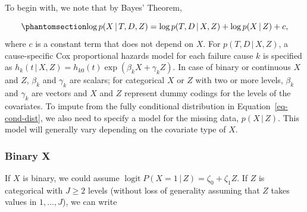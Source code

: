 \documentclass[
  letterpaper,
  DIV=11,
  numbers=noendperiod]{scrreprt}
\DeclareMathOperator{\logit}{logit}
\newcommand{\given}{\,|\,}
\begin{document}
To begin with, we note that by Bayes' Theorem,

\begin{equation}\phantomsection\label{eq-cond-dist}{
    \log p(X \given T,D,Z) = \log p(T,D \given X, Z) + \log p(X \given Z) + c,
}\end{equation} where \(c\) is a constant term that does not depend on
\(X\). For \(p(T,D \given X, Z)\), a cause-specific Cox proportional
hazards model for each failure cause \(k\) is specified as
\(h_k(t \given X, Z) = h_{k0}(t)\exp(\beta_k X + \gamma_k Z)\). In case
of binary or continuous \(X\) and \(Z\), \(\beta_k\) and \(\gamma_k\)
are scalars; for categorical \(X\) or \(Z\) with two or more levels,
\(\beta_k\) and \(\gamma_k\) are vectors and \(X\) and \(Z\) represent
dummy codings for the levels of the covariates. To impute from the fully
conditional distribution in Equation~\ref{eq-cond-dist}, we also need to
specify a model for the missing data, \(p(X \given Z)\). This model will
generally vary depending on the covariate type of \(X\).

\subsubsection{Binary X}\label{binary-x}

If \(X\) is binary, we could assume
\(\logit P(X = 1 \given Z) = \zeta_0 + \zeta_1 Z\). If \(Z\) is
categorical with \(J \geq 2\) levels (without loss of generality
assuming that \(Z\) takes values in \(1, \ldots, J\)), we can write
\end{document}
